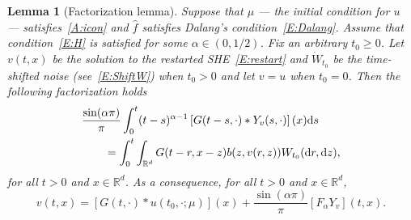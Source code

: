 \documentclass[sn-mathphys]{sn-jnl}%
\newcommand{\BR}{\mathbb{R}}
\newcommand{\ud}{\ensuremath{\mathrm{d}}}
\numberwithin{equation}{section}
\theoremstyle{thmstyleone}%
\newtheorem{lemma}[theorem]{Lemma}
\theoremstyle{thmstyletwo}%
\theoremstyle{thmstylethree}%
\begin{document}
\begin{lemma}[Factorization lemma]\label{L:Factorize}
  Suppose that $\mu$ --- the initial condition for $u$ --- satisfies~\eqref{A:icon} and
  $\widehat{f}$ satisfies Dalang's condition~\eqref{E:Dalang}. Assume that condition~\eqref{E:H} is
  satisfied for some $\alpha\in (0,1/2)$. Fix an arbitrary $ t_0\ge 0$. Let $v(t,x)$ be the solution
  to the restarted SHE~\eqref{E:restart} and $\dot{W}_{t_0}$ be the time-shifted noise
  (see~\eqref{E:ShiftW}) when $t_0>0$ and let $v = u$ when $ t_0 = 0$. Then the following
  factorization holds
  \begin{align*}
    \MoveEqLeft
    \dfrac{\sin(\alpha \pi)}{\pi}  \int_0^t (t-s)^{\alpha-1}\left[G(t-s,\cdot)*Y_v(s,\cdot)\right](x) \ud s \\
      & = \int_0^t \int_{\BR^d} G(t-r,x-z)b(z,v(r,z)) W_{t_0}(\ud r,\ud z),
  \end{align*}
  for all $t>0$ and $x\in\BR^d$. As a consequence, for all $t>0$ and $x\in\BR^d$,
  \begin{equation}\label{E:1fac}
    v(t,x) = \left[G(t, \cdot) * u(t_0,\cdot; \mu)\right](x) +\dfrac{\sin(\alpha \pi)}{\pi} \left[F_\alpha Y_v\right](t,x).
  \end{equation}
\end{lemma}
\end{document}
